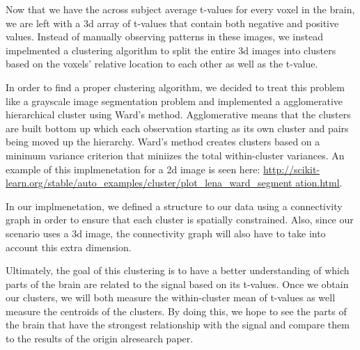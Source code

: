 \par Now that we have the across subject average t-values for every voxel in
the brain, we are left with a 3d array of t-values that contain both negative
and positive values. Instead of manually observing patterns in these images, we
instead impelmented a clustering algorithm to split the entire 3d images into
clusters based on the voxels' relative location to each other as well as the
t-value.

\par In order to find a proper clustering algorithm, we decided to treat this
problem like a grayscale image segmentation problem and implemented a
agglomerative hierarchical cluster using Ward's method. Agglomerative means
that the clusters are built bottom up which each observation starting as its
own cluster and pairs being moved up the hierarchy. Ward's method creates
clusters based on a minimum variance criterion that miniizes the total
within-cluster variances. An example of this implmenetation for a 2d image is
seen here: 
\url{http://scikit-learn.org/stable/auto_examples/cluster/plot_lena_ward_segment
 ation.html}.

In our implmenetation, we defined a structure to our data using a connectivity
graph in order to ensure that each cluster is spatially constrained. Also,
since our scenario uses a 3d image, the connectivity graph will also have to
take into account this extra dimension.

\par Ultimately, the goal of this clustering is to have a better understanding
of which parts of the brain are related to the signal based on its t-values.
Once we obtain our clusters, we will both measure the within-cluster mean of
t-values as well measure the centroids of the clusters. By doing this, we hope
to see the parts of the brain that have the strongest relationship with the
signal and compare them to the results of the origin alresearch paper.



